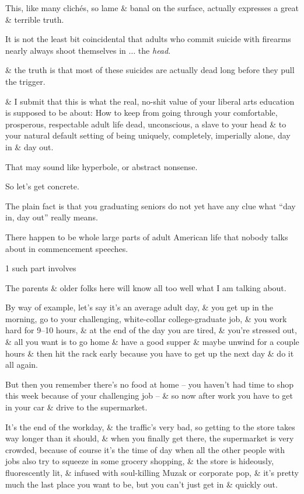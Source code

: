 \documentclass{article}
\begin{document}
This, like many clich\'es, so lame \& banal on the surface, actually expresses a great \& terrible truth.

It is not the least bit coincidental that adults who commit suicide with firearms nearly always shoot themselves in $\ldots$ the {\it head}.

\& the truth is that most of these suicides are actually dead long before they pull the trigger.

\& I submit that this is what the real, no-shit value of your liberal arts education is supposed to be about: How to keep from going through your comfortable, prosperous, respectable adult life dead, unconscious, a slave to your head \& to your natural default setting of being uniquely, completely, imperially alone, day in \& day out.

That may sound like hyperbole, or abstract nonsense.

So let's get concrete.

The plain fact is that you graduating seniors do not yet have any clue what ``day in, day out'' really means.

There happen to be whole large parts of adult American life that nobody talks about in commencement speeches.

1 such part involves 

The parents \& older folks here will know all too well what I am talking about.

By way of example, let's say it's an average adult day, \& you get up in the morning, go to your challenging, white-collar college-graduate job, \& you work hard for 9--10 hours, \& at the end of the day you are tired, \& you're stressed out, \& all you want is to go home \& have a good supper \& maybe unwind for a couple hours \& then hit the rack early because you have to get up the next day \& do it all again.

But then you remember there's no food at home -- you haven't had time to shop this week because of your challenging job -- \& so now after work you have to get in your car \& drive to the supermarket.

It's the end of the workday, \& the traffic's very bad, so getting to the store takes way longer than it should, \& when you finally get there, the supermarket is very crowded, because of course it's the time of day when all the other people with jobs also try to squeeze in some grocery shopping, \& the store is hideously, fluorescently lit, \& infused with soul-killing Muzak or corporate pop, \& it's pretty much the last place you want to be, but you can't just get in \& quickly out.
\end{document}
